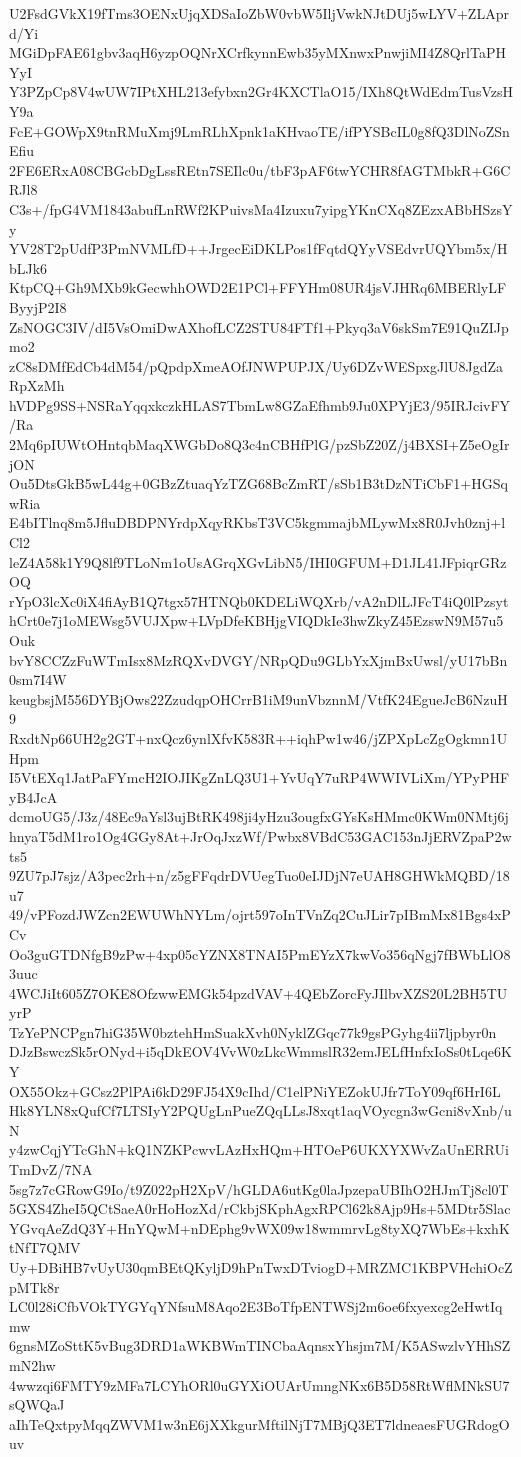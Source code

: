 U2FsdGVkX19fTms3OENxUjqXDSaIoZbW0vbW5IljVwkNJtDUj5wLYV+ZLAprd/Yi
MGiDpFAE61gbv3aqH6yzpOQNrXCrfkynnEwb35yMXnwxPnwjiMI4Z8QrlTaPHYyI
Y3PZpCp8V4wUW7IPtXHL213efybxn2Gr4KXCTlaO15/IXh8QtWdEdmTusVzsHY9a
FcE+GOWpX9tnRMuXmj9LmRLhXpnk1aKHvaoTE/ifPYSBcIL0g8fQ3DlNoZSnEfiu
2FE6ERxA08CBGcbDgLssREtn7SEIlc0u/tbF3pAF6twYCHR8fAGTMbkR+G6CRJl8
C3s+/fpG4VM1843abufLnRWf2KPuivsMa4Izuxu7yipgYKnCXq8ZEzxABbHSzsYy
YV28T2pUdfP3PmNVMLfD++JrgecEiDKLPos1fFqtdQYyVSEdvrUQYbm5x/HbLJk6
KtpCQ+Gh9MXb9kGecwhhOWD2E1PCl+FFYHm08UR4jsVJHRq6MBERlyLFByyjP2I8
ZsNOGC3IV/dI5VsOmiDwAXhofLCZ2STU84FTf1+Pkyq3aV6skSm7E91QuZIJpmo2
zC8sDMfEdCb4dM54/pQpdpXmeAOfJNWPUPJX/Uy6DZvWESpxgJlU8JgdZaRpXzMh
hVDPg9SS+NSRaYqqxkczkHLAS7TbmLw8GZaEfhmb9Ju0XPYjE3/95IRJcivFY/Ra
2Mq6pIUWtOHntqbMaqXWGbDo8Q3c4nCBHfPlG/pzSbZ20Z/j4BXSI+Z5eOgIrjON
Ou5DtsGkB5wL44g+0GBzZtuaqYzTZG68BcZmRT/sSb1B3tDzNTiCbF1+HGSqwRia
E4bITlnq8m5JfluDBDPNYrdpXqyRKbsT3VC5kgmmajbMLywMx8R0Jvh0znj+lCl2
leZ4A58k1Y9Q8lf9TLoNm1oUsAGrqXGvLibN5/IHI0GFUM+D1JL41JFpiqrGRzOQ
rYpO3lcXc0iX4fiAyB1Q7tgx57HTNQb0KDELiWQXrb/vA2nDlLJFcT4iQ0lPzsyt
hCrt0e7j1oMEWsg5VUJXpw+LVpDfeKBHjgVIQDkIe3hwZkyZ45EzswN9M57u5Ouk
bvY8CCZzFuWTmIsx8MzRQXvDVGY/NRpQDu9GLbYxXjmBxUwsl/yU17bBn0sm7I4W
keugbsjM556DYBjOws22ZzudqpOHCrrB1iM9unVbznnM/VtfK24EgueJcB6NzuH9
RxdtNp66UH2g2GT+nxQcz6ynlXfvK583R++iqhPw1w46/jZPXpLcZgOgkmn1UHpm
I5VtEXq1JatPaFYmcH2IOJIKgZnLQ3U1+YvUqY7uRP4WWIVLiXm/YPyPHFyB4JcA
dcmoUG5/J3z/48Ec9aYsl3ujBtRK498ji4yHzu3ougfxGYsKsHMmc0KWm0NMtj6j
hnyaT5dM1ro1Og4GGy8At+JrOqJxzWf/Pwbx8VBdC53GAC153nJjERVZpaP2wts5
9ZU7pJ7sjz/A3pec2rh+n/z5gFFqdrDVUegTuo0eIJDjN7eUAH8GHWkMQBD/18u7
49/vPFozdJWZcn2EWUWhNYLm/ojrt597oInTVnZq2CuJLir7pIBmMx81Bgs4xPCv
Oo3guGTDNfgB9zPw+4xp05cYZNX8TNAI5PmEYzX7kwVo356qNgj7fBWbLlO83uuc
4WCJiIt605Z7OKE8OfzwwEMGk54pzdVAV+4QEbZorcFyJIlbvXZS20L2BH5TUyrP
TzYePNCPgn7hiG35W0bztehHmSuakXvh0NyklZGqc77k9gsPGyhg4ii7ljpbyr0n
DJzBswczSk5rONyd+i5qDkEOV4VvW0zLkcWmmslR32emJELfHnfxIoSs0tLqe6KY
OX55Okz+GCsz2PlPAi6kD29FJ54X9cIhd/C1elPNiYEZokUJfr7ToY09qf6HrI6L
Hk8YLN8xQufCf7LTSIyY2PQUgLnPueZQqLLsJ8xqt1aqVOycgn3wGcni8vXnb/uN
y4zwCqjYTcGhN+kQ1NZKPcwvLAzHxHQm+HTOeP6UKXYXWvZaUnERRUiTmDvZ/7NA
5sg7z7cGRowG9Io/t9Z022pH2XpV/hGLDA6utKg0laJpzepaUBIhO2HJmTj8cl0T
5GXS4ZheI5QCtSaeA0rHoHozXd/rCkbjSKphAgxRPCl62k8Ajp9Hs+5MDtr5Slac
YGvqAeZdQ3Y+HnYQwM+nDEphg9vWX09w18wmmrvLg8tyXQ7WbEs+kxhKtNfT7QMV
Uy+DBiHB7vUyU30qmBEtQKyljD9hPnTwxDTviogD+MRZMC1KBPVHchiOcZpMTk8r
LC0l28iCfbVOkTYGYqYNfsuM8Aqo2E3BoTfpENTWSj2m6oe6fxyexcg2eHwtIqmw
6gnsMZoSttK5vBug3DRD1aWKBWmTINCbaAqnsxYhsjm7M/K5ASwzlvYHhSZmN2hw
4wwzqi6FMTY9zMFa7LCYhORl0uGYXiOUArUmngNKx6B5D58RtWflMNkSU7sQWQaJ
aIhTeQxtpyMqqZWVM1w3nE6jXXkgurMftilNjT7MBjQ3ET7ldneaesFUGRdogOuv
